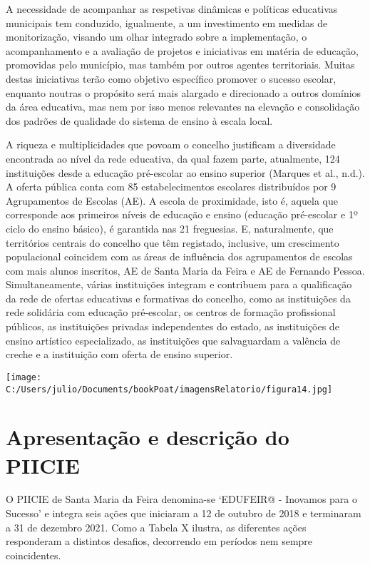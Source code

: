 \documentclass[
]{book}
\begin{document}
A necessidade de acompanhar as respetivas dinâmicas e políticas educativas municipais tem conduzido, igualmente, a um investimento em medidas de monitorização, visando um olhar integrado sobre a implementação, o acompanhamento e a avaliação de projetos e iniciativas em matéria de educação, promovidas pelo município, mas também por outros agentes territoriais. Muitas destas iniciativas terão como objetivo específico promover o sucesso escolar, enquanto noutras o propósito será mais alargado e direcionado a outros domínios da área educativa, mas nem por isso menos relevantes na elevação e consolidação dos padrões de qualidade do sistema de ensino à escala local.

A riqueza e multiplicidades que povoam o concelho justificam a diversidade encontrada ao nível da rede educativa, da qual fazem parte, atualmente, 124 instituições desde a educação pré-escolar ao ensino superior (Marques et al., n.d.). A oferta pública conta com 85 estabelecimentos escolares distribuídos por 9 Agrupamentos de Escolas (AE). A escola de proximidade, isto é, aquela que corresponde aos primeiros níveis de educação e ensino (educação pré-escolar e 1º ciclo do ensino básico), é garantida nas 21 freguesias. E, naturalmente, que territórios centrais do concelho que têm registado, inclusive, um crescimento populacional coincidem com as áreas de influência dos agrupamentos de escolas com mais alunos inscritos, AE de Santa Maria da Feira e AE de Fernando Pessoa. Simultaneamente, várias instituições integram e contribuem para a qualificação da rede de ofertas educativas e formativas do concelho, como as instituições da rede solidária com educação pré-escolar, os centros de formação profissional públicos, as instituições privadas independentes do estado, as instituições de ensino artístico especializado, as instituições que salvaguardam a valência de creche e a instituição com oferta de ensino superior.

\texttt{[image: C:/Users/julio/Documents/bookPoat/imagensRelatorio/figura14.jpg]}

\hypertarget{apresentauxe7uxe3o-e-descriuxe7uxe3o-do-piicie}{%
\section{Apresentação e descrição do PIICIE}\label{apresentauxe7uxe3o-e-descriuxe7uxe3o-do-piicie}}

O PIICIE de Santa Maria da Feira denomina-se `EDUFEIR@ - Inovamos para o Sucesso' e integra seis ações que iniciaram a 12 de outubro de 2018 e terminaram a 31 de dezembro 2021. Como a Tabela X ilustra, as diferentes ações responderam a distintos desafios, decorrendo em períodos nem sempre coincidentes.
\end{document}
